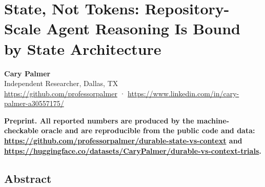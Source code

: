 \documentclass[
  10pt,
]{article}
\author{}
\date{}
\begin{document}
\section{State, Not Tokens: Repository-Scale Agent Reasoning Is Bound by
State
Architecture}\label{state-not-tokens-repository-scale-agent-reasoning-is-bound-by-state-architecture}

\textbf{Cary Palmer}\\
Independent Researcher, Dallas, TX\\
\url{https://github.com/professorpalmer} ·
\url{https://www.linkedin.com/in/cary-palmer-a30557175/}

\textbf{Preprint. All reported numbers are produced by the
machine-checkable oracle and are reproducible from the public code and
data: \url{https://github.com/professorpalmer/durable-state-vs-context}
and
\url{https://huggingface.co/datasets/CaryPalmer/durable-vs-context-trials}.}

\subsection{Abstract}\label{abstract}
\end{document}
